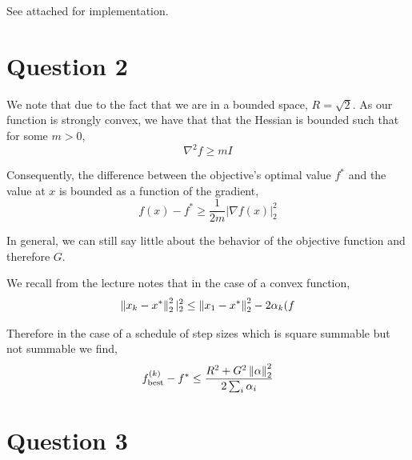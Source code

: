 \documentclass{article}
\begin{document}
See attached for implementation.

\section{Question 2}

We note that due to the fact that we are in a bounded space, $R =
\sqrt{2}$. As our function is strongly convex, we have that that the
Hessian is bounded such that for some $m > 0$,
\[ \nabla^2 f \ge m I \]

Consequently, the difference between the objective's optimal value
$f^*$ and the value at $x$ is bounded as a function of the gradient,
\[ f(x) - f^* \ge \frac{1}{2m} \vert \nabla f(x) \vert^2_2 \]

In general, we can still say little about the behavior of
the objective function and therefore $G$.

We recall from the lecture notes that in the case of a convex function,
\[ \left\lVert x_k - x^* \right\rVert_2^2 \vert_2^2 \le \left\lVert x_1 - x^* \right\rVert_2^2
   - 2\alpha_k (f \]

Therefore in the case of a schedule of step sizes which is square
summable but not summable we find,
\[ f_\mathrm{best}^{(k)} - f^* \le \frac{R^2 + G^2 \left\lVert \alpha \right\rVert_2^2}{2 \sum_i \alpha_i} \]


\section{Question 3}
\end{document}
